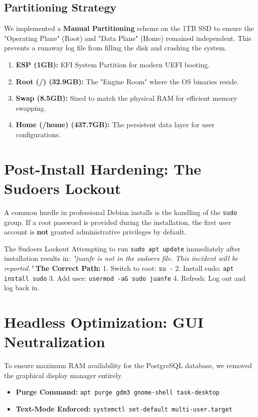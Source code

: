 \documentclass[12pt,a4paper,oneside]{book}
\begin{document}
\subsection{Partitioning Strategy}
We implemented a \textbf{Manual Partitioning} scheme on the 1TB SSD to ensure the "Operating Plane" (Root) and "Data Plane" (Home) remained independent. This prevents a runaway log file from filling the disk and crashing the system.
\begin{enumerate}
    \item \textbf{ESP (1GB):} EFI System Partition for modern UEFI booting.
    \item \textbf{Root (/) (32.9GB):} The "Engine Room" where the OS binaries reside.
    \item \textbf{Swap (8.5GB):} Sized to match the physical RAM for efficient memory swapping.
    \item \textbf{Home (/home) (437.7GB):} The persistent data layer for user configurations.
\end{enumerate}

\section{Post-Install Hardening: The Sudoers Lockout}
A common hurdle in professional Debian installs is the handling of the \texttt{sudo} group. If a root password is provided during the installation, the first user account is \textbf{not} granted administrative privileges by default.

\begin{techwarning}{The Sudoers Lockout}
Attempting to run \texttt{sudo apt update} immediately after installation results in: \textit{"juanfe is not in the sudoers file. This incident will be reported."}
\textbf{The Correct Path:}
1. Switch to root: \texttt{su -}
2. Install sudo: \texttt{apt install sudo}
3. Add user: \texttt{usermod -aG sudo juanfe}
4. Refresh: Log out and log back in.
\end{techwarning}

\section{Headless Optimization: GUI Neutralization}
To ensure maximum RAM availability for the PostgreSQL database, we removed the graphical display manager entirely.

\begin{itemize}
    \item \textbf{Purge Command:} \texttt{apt purge gdm3 gnome-shell task-desktop}
    \item \textbf{Text-Mode Enforced:} \texttt{systemctl set-default multi-user.target}
\end{itemize}
\end{document}
